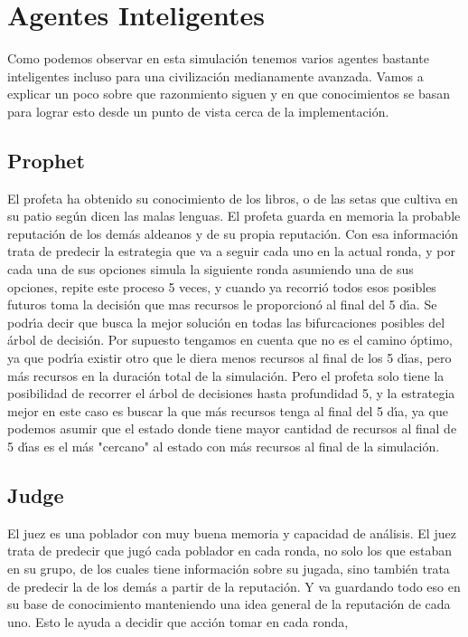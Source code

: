 \documentclass{article}
\begin{document}
\section{Agentes Inteligentes}
Como podemos observar en esta simulaci\'on tenemos varios agentes bastante inteligentes incluso para una civilizaci\'on medianamente avanzada. Vamos a explicar
un poco sobre que razonmiento siguen y en que conocimientos se basan para lograr esto desde un punto de vista cerca de la implementaci\'on.

\subsection{Prophet}
El profeta ha obtenido su conocimiento de los libros, o de las setas que cultiva en su patio seg\'un dicen las malas lenguas. El profeta guarda en memoria la
probable reputaci\'on de los dem\'as aldeanos y de su propia reputaci\'on. Con esa informaci\'on trata de predecir la estrategia que va a seguir cada uno en la actual
ronda, y por cada una de sus opciones simula la siguiente ronda asumiendo una de sus opciones, repite este proceso 5 veces, y cuando ya recorri\'o todos esos posibles
futuros toma la decisi\'on que mas recursos le proporcion\'o al final del 5 d\'{\i}a. Se podr\'{\i}a decir que busca la mejor soluci\'on en todas las bifurcaciones posibles del \'arbol de
decisi\'on. Por supuesto tengamos en cuenta que no es el camino \'optimo, ya que podr\'{\i}a existir otro que le diera menos recursos al final de los 5 d\'{\i}as, pero
m\'as recursos en la duraci\'on total de la simulaci\'on. Pero el profeta solo tiene la posibilidad de recorrer el \'arbol de decisiones hasta profundidad 5, y la estrategia
mejor en este caso es buscar la que m\'as recursos tenga al final del 5 d\'{\i}a, ya que podemos asumir que el estado donde tiene mayor cantidad de recursos al final de
5 d\'{\i}as es el m\'as "cercano" al estado con m\'as recursos al final de la simulaci\'on.

\subsection{Judge}
El juez es una poblador con muy buena memoria y capacidad de an\'alisis. El juez trata de predecir que jug\'o cada poblador en cada ronda, no solo los que estaban en su grupo,
de los cuales tiene informaci\'on sobre su jugada, sino tambi\'en trata de predecir la de los dem\'as a partir de la reputaci\'on. Y va guardando todo eso en su base de conocimiento
manteniendo una idea general de la reputaci\'on de cada uno. Esto le ayuda a decidir que acci\'on tomar en cada ronda,
\newpage
\end{document}
